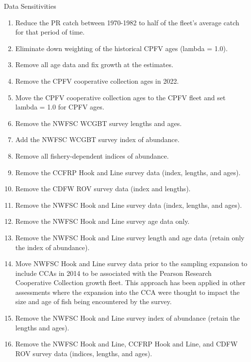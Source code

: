 \documentclass[11pt,
  english,
  letterpaper,
]{article}
\begin{document}
Data Sensitivities

\begin{enumerate}
   
  \item Reduce the PR catch between 1970-1982 to half of the fleet's average catch for that period of time.
  
  \item Eliminate down weighting of the historical CPFV ages (lambda = 1.0).
  
  \item Remove all age data and fix growth at the estimates.
  
  \item Remove the CPFV cooperative collection ages in 2022.
  
  \item Move the CPFV cooperative collection ages to the CPFV fleet and set lambda = 1.0 for CPFV ages.
  
  \item Remove the NWFSC WCGBT survey lengths and ages.
  
  \item Add the NWFSC WCGBT survey index of abundance.
  
  \item Remove all fishery-dependent indices of abundance.
  
  \item Remove the CCFRP Hook and Line survey data (index, lengths, and ages).
  
  \item Remove the CDFW ROV survey data (index and lengths).
  
  \item Remove the NWFSC Hook and Line survey data (index, lengths, and ages).
  
  \item Remove the NWFSC Hook and Line survey age data only.
  
  \item Remove the NWFSC Hook and Line survey length and age data (retain only the index of abundance).
  
  \item Move NWFSC Hook and Line survey data prior to the sampling expansion to include CCAs in 2014 to be associated with the Pearson Research Cooperative Collection growth fleet. This approach has been applied in other assessments where the expansion into the CCA were thought to impact the size and age of fish being encountered by the survey. 
  
  \item Remove the NWFSC Hook and Line survey index of abundance (retain the lengths and ages).
  
  \item Remove the NWFSC Hook and Line, CCFRP Hook and Line, and CDFW ROV survey data (indices, lengths, and ages).

\end{enumerate}
\end{document}
